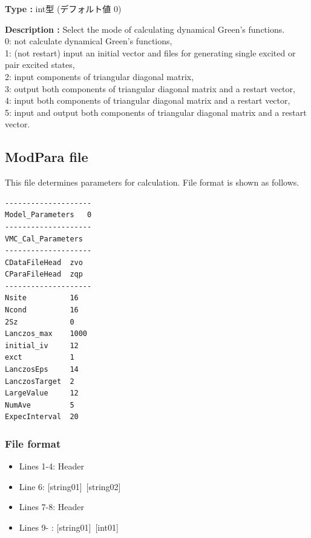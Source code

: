 \begin{itemize}
{\bf Type :} {int型 (デフォルト値 0)}

{\bf Description :} {
{
Select the mode of calculating dynamical Green's functions.\\
0: not calculate  dynamical Green's functions,\\
1: (not restart) input an initial vector and files for generating single excited or pair excited states,\\
2: input components of triangular diagonal matrix, \\
3: output both components of triangular diagonal matrix and a restart vector,\\
4: input both components of triangular diagonal matrix and a restart vector,\\
5: input and output  both components of triangular diagonal matrix and a restart vector.\\
}
}

\end{itemize}

\newpage
\subsection{ModPara file}
\label{Subsec:modpara}
This file determines parameters for calculation. File format is shown as follows.\\
\begin{minipage}{10cm}
\begin{screen}
\begin{verbatim}
--------------------
Model_Parameters   0
--------------------
VMC_Cal_Parameters
--------------------
CDataFileHead  zvo
CParaFileHead  zqp
--------------------
Nsite          16   
Ncond          16    
2Sz            0 
Lanczos_max    1000 
initial_iv     12   
exct           1    
LanczosEps     14   
LanczosTarget  2    
LargeValue     12   
NumAve         5    
ExpecInterval  20   
\end{verbatim}
\end{screen}
\end{minipage}

\subsubsection{File format}
 \begin{itemize}
   \item  Lines 1-4:  Header
   \item  Line 6:  [string01]~[string02]
   \item  Lines 7-8:  Header
   \item  Lines 9- : [string01]~[int01]
  \end{itemize}
